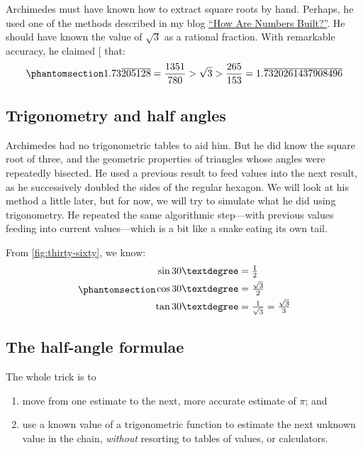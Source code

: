 \documentclass[
  a4paper,
]{article}
\begin{document}
Archimedes must have known how to extract square roots by hand. Perhaps,
he used one of the methods described in my blog
\href{https://swanlotus.netlify.app/blogs/how-are-numbers-built}{``How
Are Numbers Built?''}. He should have known the value of \(\sqrt{3}\) as
a rational fraction. With remarkable accuracy, he claimed
{[}\citeproc{ref-heath2002}{3}{]} that:
\begin{equation}\phantomsection\label{eq:sqrt3}{
1.73\overline{205128} = \frac{1351}{780} > \sqrt{3} > \frac{265}{153} = 1.\overline{7320261437908496}    
}\end{equation}

\subsection{Trigonometry and half
angles}\label{trigonometry-and-half-angles}

Archimedes had no trigonometric tables to aid him. But he did know the
square root of three, and the geometric properties of triangles whose
angles were repeatedly bisected. He used a previous result to feed
values into the next result, as he successively doubled the sides of the
regular hexagon. We will look at his method a little later, but for now,
we will try to simulate what he did using trigonometry. He repeated the
same algorithmic step---with previous values feeding into current
values---which is a bit like a snake eating its own tail.

From \cref{fig:thirty-sixty}, we know:
\begin{equation}\phantomsection\label{eq:three-six-nine}{
\begin{aligned}
\sin 30° &= \tfrac{1}{2}\\
\cos 30° &= \tfrac{\sqrt{3}}{2}\\
\tan 30° &= \tfrac{1}{\sqrt{3}} = \tfrac{\sqrt{3}}{3}\\
\end{aligned}
}\end{equation}

\subsection{The half-angle formulae}\label{the-half-angle-formulae}

The whole trick is to

\begin{enumerate}
\def\labelenumi{\alph{enumi}.}
\item
  move from one estimate to the next, more accurate estimate of \(\pi\);
  and
\item
  use a known value of a trigonometric function to estimate the next
  unknown value in the chain, \emph{without} resorting to tables of
  values, or calculators.
\end{enumerate}
\end{document}
